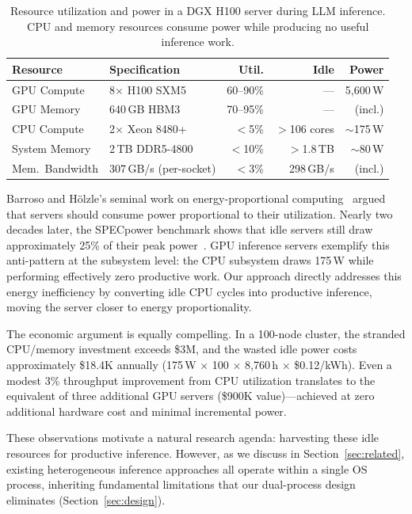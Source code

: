 \documentclass[10pt,conference]{IEEEtran}
\begin{document}
\begin{table}[t]
\centering
\caption{Resource utilization and power in a DGX H100 server during LLM inference. CPU and memory resources consume power while producing no useful inference work.}
\label{tab:idle-resources}
\footnotesize
\begin{tabular}{@{}llrrr@{}}
\toprule
\textbf{Resource} & \textbf{Specification} & \textbf{Util.} & \textbf{Idle} & \textbf{Power} \\
\midrule
GPU Compute & 8$\times$ H100 SXM5 & 60--90\% & --- & 5,600\,W \\
GPU Memory & 640\,GB HBM3 & 70--95\% & --- & (incl.) \\
\midrule
CPU Compute & 2$\times$ Xeon 8480+ & $<$5\% & $>$106 cores & $\sim$175\,W \\
System Memory & 2\,TB DDR5-4800 & $<$10\% & $>$1.8\,TB & $\sim$80\,W \\
Mem.\ Bandwidth & 307\,GB/s (per-socket) & $<$3\% & 298\,GB/s & (incl.) \\
\bottomrule
\end{tabular}
\end{table}

Barroso and H\"{o}lzle's seminal work on energy-proportional computing~\cite{barroso2007energy} argued that servers should consume power proportional to their utilization.
Nearly two decades later, the SPECpower benchmark shows that idle servers still draw approximately 25\% of their peak power~\cite{specpower2024}.
GPU inference servers exemplify this anti-pattern at the subsystem level: the CPU subsystem draws 175\,W while performing effectively zero productive work.
Our approach directly addresses this energy inefficiency by converting idle CPU cycles into productive inference, moving the server closer to energy proportionality.

The economic argument is equally compelling.
In a 100-node cluster, the stranded CPU/memory investment exceeds \$3M, and the wasted idle power costs approximately \$18.4K annually (175\,W $\times$ 100 $\times$ 8{,}760\,h $\times$ \$0.12/kWh).
Even a modest 3\% throughput improvement from CPU utilization translates to the equivalent of three additional GPU servers (\$900K value)---achieved at zero additional hardware cost and minimal incremental power.

These observations motivate a natural research agenda: harvesting these idle resources for productive inference.
However, as we discuss in Section~\ref{sec:related}, existing heterogeneous inference approaches all operate within a single OS process, inheriting fundamental limitations that our dual-process design eliminates (Section~\ref{sec:design}).
\end{document}
